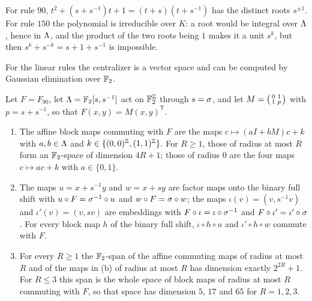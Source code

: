 For rule $90$, $t^2+(s+s^{-1})t+1=(t+s)(t+s^{-1})$ has the distinct roots $s^{\pm1}$. For rule $150$ the polynomial is irreducible over $K$: a root would be integral over $\Lambda$, hence in $\Lambda$, and the product of the two roots being $1$ makes it a unit $s^k$, but then $s^k+s^{-k}=s+1+s^{-1}$ is impossible.

For the linear rules the centralizer is a vector space and can be computed by Gaussian elimination over $\mathbb{F}_2$.

\begin{theorem}\label{thm:90}
Let $F=F_{90}$, let $\Lambda=\mathbb{F}_2[s,s^{-1}]$ act on $\mathbb{F}_2^{\mathbb{Z}}$ through $s=\sigma$, and let $M=\begin{psmallmatrix}0&1\\1&p\end{psmallmatrix}$ with $p=s+s^{-1}$, so that $F(x,y)=M(x,y)^{\mathsf T}$.
\begin{enumerate}
\item[(a)] The affine block maps commuting with $F$ are the maps $c\mapsto (aI+bM)c+k$ with $a,b\in\Lambda$ and $k\in\{(0,0)^{\mathbb{Z}},(1,1)^{\mathbb{Z}}\}$. For $R\ge1$, those of radius at most $R$ form an $\mathbb{F}_2$-space of dimension $4R+1$; those of radius $0$ are the four maps $c\mapsto ac+k$ with $a\in\{0,1\}$.
\item[(b)] The maps $u=x+s^{-1}y$ and $w=x+sy$ are factor maps onto the binary full shift with $u\circ F=\sigma^{-1}\circ u$ and $w\circ F=\sigma\circ w$; the maps $\iota(v)=(v,s^{-1}v)$ and $\iota'(v)=(v,sv)$ are embeddings with $F\circ\iota=\iota\circ\sigma^{-1}$ and $F\circ\iota'=\iota'\circ\sigma$. For every block map $h$ of the binary full shift, $\iota\circ h\circ u$ and $\iota'\circ h\circ w$ commute with $F$.
\item[(c)] For every $R\ge1$ the $\mathbb{F}_2$-span of the affine commuting maps of radius at most $R$ and of the maps in (b) of radius at most $R$ has dimension exactly $2^{2R}+1$. For $R\le3$ this span is the whole space of block maps of radius at most $R$ commuting with $F$, so that space has dimension $5$, $17$ and $65$ for $R=1,2,3$.
\end{enumerate}
\end{theorem}

